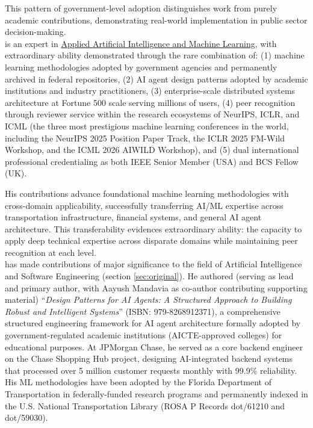 This pattern of government-level adoption distinguishes \drs work from purely academic contributions, demonstrating real-world implementation in public sector decision-making.\\

\dr is an expert in \underline{Applied Artificial Intelligence and Machine Learning}, with extraordinary ability demonstrated through the rare combination of: (1) machine learning methodologies adopted by government agencies and permanently archived in federal repositories, (2) AI agent design patterns adopted by academic institutions and industry practitioners, (3) enterprise-scale distributed systems architecture at Fortune 500 scale serving millions of users, (4) peer recognition through reviewer service within the research ecosystems of NeurIPS, ICLR, and ICML (the three most prestigious machine learning conferences in the world, including the NeurIPS 2025 Position Paper Track, the ICLR 2025 FM-Wild Workshop, and the ICML 2026 AIWILD Workshop), and (5) dual international professional credentialing as both IEEE Senior Member (USA) and BCS Fellow (UK).

His contributions advance foundational machine learning methodologies with cross-domain applicability, successfully transferring AI/ML expertise across transportation infrastructure, financial systems, and general AI agent architecture. This transferability evidences extraordinary ability: the capacity to apply deep technical expertise across disparate domains while maintaining peer recognition at each level.\\


\dr has made contributions of major significance to the field of Artificial Intelligence and Software Engineering (section \ref{sec:original}). He authored (serving as lead and primary author, with Aayush Mandavia as co-author contributing supporting material) ``\emph{Design Patterns for AI Agents: A Structured Approach to Building Robust and Intelligent Systems}'' (ISBN: 979-8268912371), a comprehensive structured engineering framework for AI agent architecture formally adopted by government-regulated academic institutions (AICTE-approved colleges) for educational purposes. At JPMorgan Chase, he served as a core backend engineer on the Chase Shopping Hub project, designing AI-integrated backend systems that processed over 5 million customer requests monthly with 99.9\% reliability. His ML methodologies have been adopted by the Florida Department of Transportation in federally-funded research programs and permanently indexed in the U.S. National Transportation Library (ROSA P Records dot/61210 and dot/59030).\\

